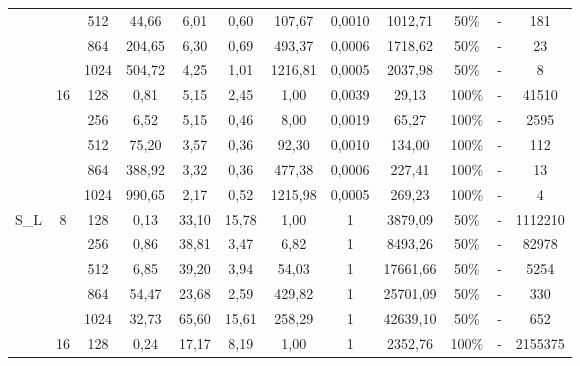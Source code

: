 \documentclass[10pt,a4paper]{article}
\begin{document}
\begin{center}
\begin{tabular}{ |c|c|c|c|c|c|c|c|c|c|c|c| }
		                        &                     & 512  & 44,66  & 6,01   & 0,60   & 107,67     & 0,0010 & 1012,71  & 50\%  & - & 181     \\ \cline{3-12}
		                        &                     & 864  & 204,65 & 6,30   & 0,69   & 493,37     & 0,0006 & 1718,62  & 50\%  & - & 23      \\ \cline{3-12}
		                        &                     & 1024 & 504,72 & 4,25   & 1,01   & 1216,81    & 0,0005 & 2037,98  & 50\%  & - & 8       \\ \cline{2-12}
		                        & \multirow{5}{*}{16} & 128  & 0,81   & 5,15   & 2,45   & 1,00       & 0,0039 & 29,13    & 100\% & - & 41510   \\ \cline{3-12}
		                        &                     & 256  & 6,52   & 5,15   & 0,46   & 8,00       & 0,0019 & 65,27    & 100\% & - & 2595    \\ \cline{3-12}
		                        &                     & 512  & 75,20  & 3,57   & 0,36   & 92,30      & 0,0010 & 134,00   & 100\% & - & 112     \\ \cline{3-12}
		                        &                     & 864  & 388,92 & 3,32   & 0,36   & 477,38     & 0,0006 & 227,41   & 100\% & - & 13      \\ \cline{3-12}
		                        &                     & 1024 & 990,65 & 2,17   & 0,52   & 1215,98    & 0,0005 & 269,23   & 100\% & - & 4       \\ \cline{1-12}
		\multirow{10}{*}{S\_L}  & \multirow{5}{*}{8}  & 128  & 0,13   & 33,10  & 15,78  & 1,00       & 1      & 3879,09  & 50\%  & - & 1112210 \\ \cline{3-12}
		                        &                     & 256  & 0,86   & 38,81  & 3,47   & 6,82       & 1      & 8493,26  & 50\%  & - & 82978   \\ \cline{3-12}
		                        &                     & 512  & 6,85   & 39,20  & 3,94   & 54,03      & 1      & 17661,66 & 50\%  & - & 5254    \\ \cline{3-12}
		                        &                     & 864  & 54,47  & 23,68  & 2,59   & 429,82     & 1      & 25701,09 & 50\%  & - & 330     \\ \cline{3-12}
		                        &                     & 1024 & 32,73  & 65,60  & 15,61  & 258,29     & 1      & 42639,10 & 50\%  & - & 652     \\ \cline{2-12}
		                        & \multirow{5}{*}{16} & 128  & 0,24   & 17,17  & 8,19   & 1,00       & 1      & 2352,76  & 100\% & - & 2155375 \\ \cline{3-12}

\end{tabular}
\end{center}
\end{document}
